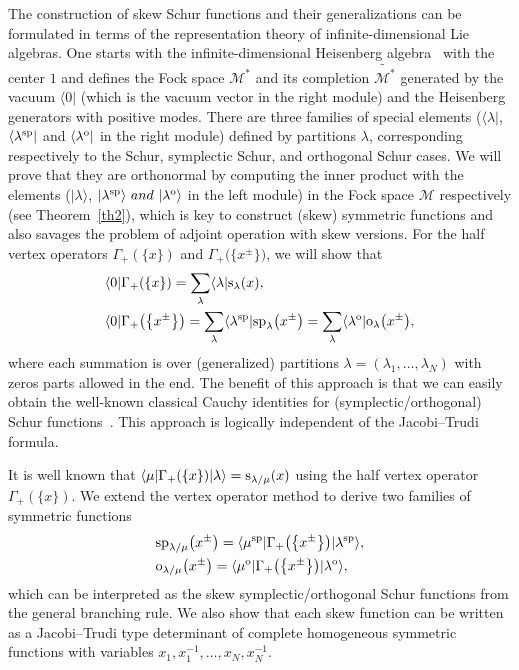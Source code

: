 \documentclass[10pt,a4paper]{amsart}
\numberwithin{equation}{section}
\begin{document}
The construction of skew Schur functions and their generalizations can be formulated in terms of the representation theory of infinite-dimensional Lie algebras.
One starts with the infinite-dimensional Heisenberg algebra~\cite{FK1980} with the center $1$ and defines the Fock space $\mathcal{M}^*$ and its completion $\widetilde{\mathcal{M}^*}$ generated by the vacuum $\langle0|$ (which is the vacuum vector in the right module) and the Heisenberg generators with positive modes. There are three families of special elements ($\langle\lambda|$, $\langle\lambda^{\rm sp}|$ and $\langle\lambda^{\rm o}|$
in the right module) defined by partitions $\lambda$, corresponding respectively to the Schur, symplectic Schur, and orthogonal Schur cases. We will prove that they are orthonormal by computing the inner product with the elements ($|\lambda\rangle$, $|\lambda^{\rm sp}\rangle~and~|\lambda^{\rm o}\rangle$ in the left module) in the Fock space $\mathcal{M}$ respectively (see Theorem~\ref{th2}), which is key to construct (skew) symmetric functions and also savages the problem of adjoint operation with skew versions. For the half vertex operators $\Gamma_+(\{x\})$ and $\Gamma_+\big(\big\{x^{\pm}\big\}\big)$, we will show that
\begin{align*}
&\langle 0|\Gamma_+(\{x\})=\sum_{\lambda}\langle \lambda|{\rm s}_\lambda(x),\\
&\langle 0|\Gamma_+\big(\big\{x^{\pm}\big\}\big)=\sum_{\lambda}\langle \lambda^{\rm sp}|{\rm sp}_\lambda\big(x^{\pm}\big)=\sum_{\lambda}\langle \lambda^{\rm o}|{\rm o}_\lambda\big(x^{\pm}\big),
\end{align*}
where each summation is over (generalized) partitions $\lambda=(\lambda_1,\dots,\lambda_N)$ with zeros parts allowed in the end. The benefit of this approach is that we can easily obtain the well-known classical Cauchy identities for (symplectic/orthogonal) Schur functions~\cite{KT1987,Su1990}. This approach is logically independent of the Jacobi--Trudi formula.

It is well known that $\langle \mu|\Gamma_+(\{x\})|\lambda\rangle={\rm s}_{\lambda/\mu}(x)$ \cite{Lam2006,Oko2001} using the half vertex operator
$\Gamma_+(\{x\})$. We extend the vertex operator method to derive two families of symmetric functions
\begin{align*}
&{\rm sp}_{\lambda/\mu}\big(x^{\pm}\big)=\langle\mu^{\rm sp}|\Gamma_+\big(\big\{x^{\pm}\big\}\big)|\lambda^{\rm sp}\rangle,\\
&{\rm o}_{\lambda/\mu}\big(x^{\pm}\big)=\langle\mu^{\rm o}|\Gamma_+\big(\big\{x^{\pm}\big\}\big)|\lambda^{\rm o}\rangle,
\end{align*}
which can be interpreted as the skew symplectic/orthogonal Schur functions from the general branching rule. We also show that each skew function can be written as a Jacobi--Trudi type determinant of complete homogeneous symmetric functions with variables $x_1,x^{-1}_1,\dots,x_N,x^{-1}_N$.
\end{document}
